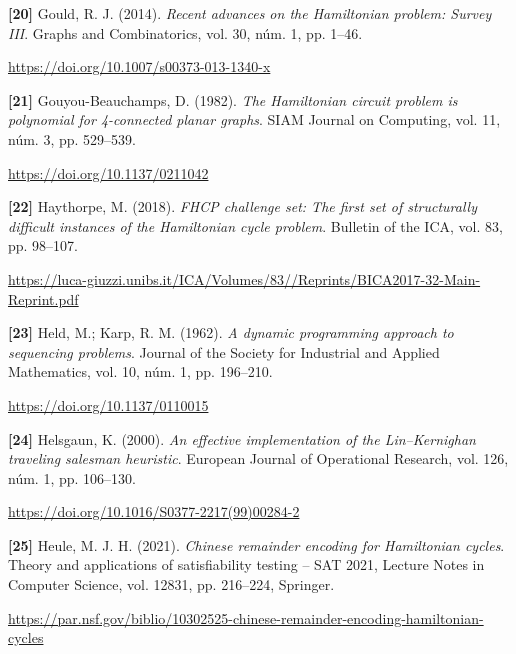 \documentclass[11pt,a4paper]{article}
\newcommand{\referencia}[1]{\par\addvspace{0.8\baselineskip}\noindent\hangindent=1.1cm\hangafter=1 #1\par\nopagebreak}
\begin{document}
\begin{samepage}
\referencia{\textbf{[20]} Gould, R. J. (2014). \textit{Recent advances on the {Hamiltonian} problem: {Survey III}}. Graphs and Combinatorics, vol. 30, núm. 1, pp. 1--46.}
 {\small\url{https://doi.org/10.1007/s00373-013-1340-x}}\par
\end{samepage}
\begin{samepage}
\referencia{\textbf{[21]} Gouyou-Beauchamps, D. (1982). \textit{The {Hamiltonian} circuit problem is polynomial for 4-connected planar graphs}. SIAM Journal on Computing, vol. 11, núm. 3, pp. 529--539.}
 {\small\url{https://doi.org/10.1137/0211042}}\par
\end{samepage}
\begin{samepage}
\referencia{\textbf{[22]} Haythorpe, M. (2018). \textit{{FHCP} challenge set: The first set of structurally difficult instances of the {Hamiltonian} cycle problem}. Bulletin of the ICA, vol. 83, pp. 98--107.}
 {\small\url{https://luca-giuzzi.unibs.it/ICA/Volumes/83//Reprints/BICA2017-32-Main-Reprint.pdf}}\par
\end{samepage}
\begin{samepage}
\referencia{\textbf{[23]} Held, M.; Karp, R. M. (1962). \textit{A dynamic programming approach to sequencing problems}. Journal of the Society for Industrial and Applied Mathematics, vol. 10, núm. 1, pp. 196--210.}
 {\small\url{https://doi.org/10.1137/0110015}}\par
\end{samepage}
\begin{samepage}
\referencia{\textbf{[24]} Helsgaun, K. (2000). \textit{An effective implementation of the {Lin--Kernighan} traveling salesman heuristic}. European Journal of Operational Research, vol. 126, núm. 1, pp. 106--130.}
 {\small\url{https://doi.org/10.1016/S0377-2217(99)00284-2}}\par
\end{samepage}
\begin{samepage}
\referencia{\textbf{[25]} Heule, M. J. H. (2021). \textit{Chinese remainder encoding for {Hamiltonian} cycles}. Theory and applications of satisfiability testing -- {SAT} 2021, Lecture Notes in Computer Science, vol. 12831, pp. 216--224, Springer.}
 {\small\url{https://par.nsf.gov/biblio/10302525-chinese-remainder-encoding-hamiltonian-cycles}}\par
\end{samepage}
\end{document}
